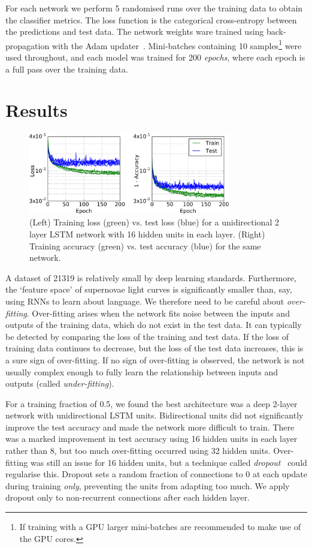 \documentclass[twocolumn]{aastex61}
\begin{document}
For each network we perform 5 randomised runs over the training data to obtain the classifier metrics. The loss function is the categorical cross-entropy between the predictions and test data. The network weights ware trained using back-propagation with the {\ttfamily Adam} updater~\cite{2014arXiv1412.6980K}. Mini-batches containing 10 samples\footnote{If training with a GPU larger mini-batches are recommended to make use of the GPU cores.} were used throughout, and each model was trained for 200 {\em epochs}, where each epoch is a full pass over the training data.

\section{Results}

\begin{figure}
\centering
\includegraphics[width=88mm, angle=0]{f3.pdf}
\caption{\label{fig:loss} (Left) Training loss (green) vs. test loss (blue) for a unidirectional 2 layer LSTM network with 16 hidden units in each layer. (Right) Training accuracy (green) vs. test accuracy (blue) for the same network.  }
\end{figure}

A dataset of 21319 is relatively small by deep learning standards. Furthermore, the `feature space' of supernovae light curves is significantly smaller than, say, using RNNs to learn about language. We therefore need to be careful about {\em over-fitting}. Over-fitting arises when the network fits noise between the inputs and outputs of the training data, which do not exist in the test data. It can typically be detected by comparing the loss of the training and test data. If the loss of training data continues to decrease, but the loss of the test data increases, this is a sure sign of over-fitting. If no sign of over-fitting is observed, the network is not usually complex enough to fully learn the relationship between inputs and outputs (called {\em under-fitting}).  

For a training fraction of 0.5, we found the best architecture was a deep 2-layer network with unidirectional LSTM units. Bidirectional units did not significantly improve the test accuracy and made the network more difficult to train. There was a marked improvement in test accuracy using 16 hidden units in each layer rather than 8, but too much over-fitting occurred using 32 hidden units. Over-fitting was still an issue for 16 hidden units,  but a technique called {\em dropout}~\cite{JMLR:v15:srivastava14a} could regularise this. Dropout sets a random fraction of connections to 0 at each update during training {\em only}, preventing the units from adapting too much. We apply dropout only to non-recurrent connections after each hidden layer. 
\end{document}
